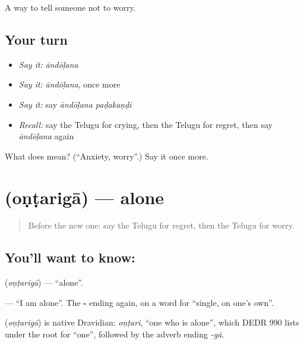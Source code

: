 \begin{grammarlens}[title={What you've built}]
A way to tell someone not to worry.
\end{grammarlens}

\subsection*{Your turn}
\begin{itemize}
\raggedright
  \item \emph{Say it:} \emph{āndōḷana}
  \item \emph{Say it:} \emph{āndōḷana}, once more
  \item \emph{Say it:} say \emph{āndōḷana paḍakaṇḍi}
  \item \emph{Recall:} say the Telugu for crying, then the Telugu for regret, then say \emph{āndōḷana} again
\end{itemize}

\begin{tcolorbox}[breakable,colback=teal!4,colframe=teal!35!black,title={Before you move on}]
What does  mean? (\textquotedblleft{}Anxiety, worry\textquotedblright{}.) Say it once more.
\end{tcolorbox}
\section[\texorpdfstring{\te{ఒంటరిగా} (oṇṭarigā)}{ఒంటరిగా (oṇṭarigā)}]{ (oṇṭarigā) — alone}

\label{lesson:TE-C97-alone}



\begin{quote}
Before the new one: say the Telugu for regret, then the Telugu for worry.
\end{quote}

\subsection*{You'll want to know: }
\textbf{} (\emph{oṇṭarigā}) — \textquotedblleft{}alone\textquotedblright{}.

\textbf{  } — \textquotedblleft{}I am alone\textquotedblright{}. The \textbf{-} ending again, on a word for \textquotedblleft{}single, on one's own\textquotedblright{}.

\begin{cousinweb}
\textbf{} (\emph{oṇṭarigā}) is native Dravidian: \emph{oṇṭari}, \textquotedblleft{}one who is alone\textquotedblright{}, which DEDR 990 lists under the root for \textquotedblleft{}one\textquotedblright{}, followed by the adverb ending \emph{-gā}.
\end{cousinweb}

